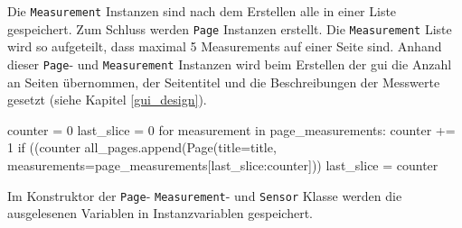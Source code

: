 Die \lstinline{Measurement} Instanzen sind nach dem Erstellen alle in einer Liste gespeichert. Zum Schluss werden \lstinline{Page} Instanzen erstellt. Die \lstinline{Measurement} Liste wird so aufgeteilt, dass maximal 5 Measurements auf einer Seite sind. Anhand dieser \lstinline{Page}- und \lstinline{Measurement} Instanzen wird beim Erstellen der \acs{gui} die Anzahl an Seiten übernommen, der Seitentitel und die Beschreibungen der Messwerte gesetzt (siehe Kapitel \ref{gui_design}). 
\begin{pythoncode}
counter = 0
last_slice = 0
for measurement in page_measurements:
	counter += 1
	if ((counter %
		all_pages.append(Page(title=title, measurements=page_measurements[last_slice:counter]))
		last_slice = counter
\end{pythoncode}


Im Konstruktor der \lstinline{Page}- \lstinline{Measurement}- und \lstinline{Sensor} Klasse werden die ausgelesenen Variablen in Instanzvariablen gespeichert.